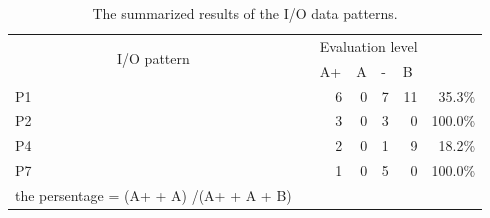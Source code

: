 \begin{table}[htbp]
\centering
\caption{The summarized results of the I/O data patterns.}
  \begin{tabular}{lrrrrrr}
\cline{1-6}    \multicolumn{1}{|c}{\multirow{2}[4]{*}{I/O pattern }} & \multicolumn{1}{r|}{} & \multicolumn{4}{c|}{Evaluation level} &  \bigstrut\\
\cline{3-6}    \multicolumn{1}{|c}{} & \multicolumn{1}{r|}{} & \multicolumn{1}{l|}{A+} & \multicolumn{1}{l|}{A} & \multicolumn{1}{l|}{-} & \multicolumn{1}{l|}{B} &  \bigstrut\\
\cline{1-6}    \multicolumn{1}{|l|}{P1} & \multicolumn{1}{r|}{} & \multicolumn{1}{r|}{6} & \multicolumn{1}{r|}{0} & \multicolumn{1}{r|}{7} & \multicolumn{1}{r|}{11} & 35.3\% \bigstrut\\
\cline{1-6}    \multicolumn{1}{|l|}{P2} & \multicolumn{1}{r|}{} & \multicolumn{1}{r|}{3} & \multicolumn{1}{r|}{0} & \multicolumn{1}{r|}{3} & \multicolumn{1}{r|}{0} & 100.0\% \bigstrut\\
\cline{1-6}    \multicolumn{1}{|l|}{P4} & \multicolumn{1}{r|}{} & \multicolumn{1}{r|}{2} & \multicolumn{1}{r|}{0} & \multicolumn{1}{r|}{1} & \multicolumn{1}{r|}{9} & 18.2\% \bigstrut\\
\cline{1-6}    \multicolumn{1}{|l|}{P7} & \multicolumn{1}{r|}{} & \multicolumn{1}{r|}{1} & \multicolumn{1}{r|}{0} & \multicolumn{1}{r|}{5} & \multicolumn{1}{r|}{0} & 100.0\% \bigstrut\\
\cline{1-6}    the persentage = (A+  +  A) /(A+  +  A + B)  &       &       &       &       &       &  \bigstrut[t]\\
  \end{tabular}%
\label{tbl:D-3-tbl9}%
\end{table}%

